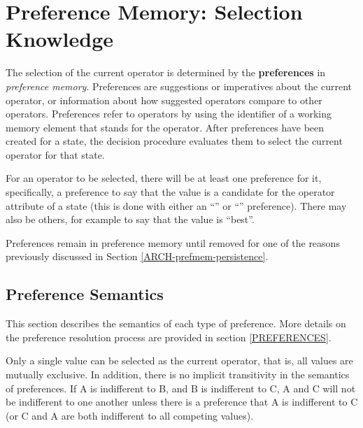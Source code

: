 \section{Preference Memory: Selection Knowledge} 
\label{ARCH-prefmem}

The selection of the current operator is determined by the \textbf{preferences} in \emph{preference memory}. Preferences are suggestions or imperatives about the current operator, or information about how suggested operators compare to other operators.  Preferences refer to operators by using the identifier of a working memory element that stands for the operator. After preferences have been created for a state, the decision procedure evaluates them to select the current operator for that state.

For an operator to be selected, there will be at least one preference for it, specifically, a preference to say that the value is a candidate for the operator attribute of a state (this is done with either an ``'' or ``'' preference). There may also be others, for example to say that the value is ``best''.

Preferences remain in preference memory until removed for one of the reasons previously discussed in Section \ref{ARCH-prefmem-persistence}.

\subsection{Preference Semantics}
\label{ARCH-prefmem-semantics}

This section describes the semantics of each type of preference.  More details on the preference resolution process are provided in section \ref{PREFERENCES}.


Only a single value can be selected as the current operator, that is, all values are mutually exclusive.  In addition, there is no implicit transitivity in the semantics of preferences.  If A is indifferent to B, and B is indifferent to C, A and C will not be indifferent to one another unless there is a preference that A is indifferent to C (or C and A are both indifferent to all competing values).

